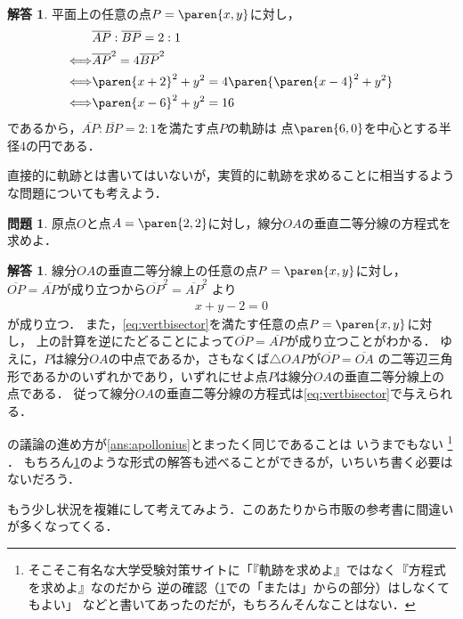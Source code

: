 \documentclass[11pt,a4paper]{ltjsarticle}
\newcommand*{\length}[1]{\overline{#1}}
\newcommand*{\equivalent}{\Longleftrightarrow}
\newcommand*{\coord}[1]{\paren{#1}}
\theoremstyle{definition}
\newtheorem{que}[dfn]{問題}
\newtheorem{ans}[dfn]{解答}
\begin{document}
\begin{ans} \label{ans:aplloniusomit}
  平面上の任意の点$P = \coord{x,y}$に対し，
  \begin{align*}
    & \length{AP} : \length{BP} = 2 : 1 \\
    \equivalent & \length{AP}^2 = 4 \length{BP}^2 \\
    \equivalent & \paren{x + 2}^2 + y^2 = 4 \paren{\paren{x - 4}^2 + y^2} \\
    \equivalent & \paren{x - 6}^2 + y^2 = 16
  \end{align*}
  であるから，$\length{AP} : \length{BP} = 2 : 1$を満たす点$P$の軌跡は
  点$\coord{6, 0}$を中心とする半径$4$の円である．
\end{ans}


直接的に軌跡とは書いてはいないが，実質的に軌跡を求めることに相当するような問題についても考えよう．

\begin{que} \label{que:vertbisector}
  原点$O$と点$A = \coord{2, 2}$に対し，線分$OA$の垂直二等分線の方程式を求めよ．
\end{que}

\begin{ans} \label{ans:vertbisector}
  線分$OA$の垂直二等分線上の任意の点$P = \coord{x, y}$に対し，
  $\length{OP} = \length{AP}$が成り立つから$\length{OP}^2 = \length{AP}^2$
  より
  \begin{align}
    x + y - 2 = 0
    \label{eq:vertbisector}
  \end{align}
  が成り立つ．
  また，\cref{eq:vertbisector}を満たす任意の点$P = \coord{x, y}$に対し，
  上の計算を逆にたどることによって$\length{OP} = \length{AP}$が成り立つことがわかる．
  ゆえに，$P$は線分$OA$の中点であるか，さもなくば$\triangle OAP$が$\length{OP} = \length{OA}$
  の二等辺三角形であるかのいずれかであり，いずれにせよ点$P$は線分$OA$の垂直二等分線上の点である．
  従って線分$OA$の垂直二等分線の方程式は\cref{eq:vertbisector}で与えられる．
\end{ans}

の議論の進め方が\cref{ans:apollonius}とまったく同じであることは
いうまでもない%
\footnote{%
  そこそこ有名な大学受験対策サイトに「『軌跡を求めよ』ではなく『方程式を求めよ』なのだから
  逆の確認（\cref{ans:vertbisector}での「または」からの部分）はしなくてもよい」
  などと書いてあったのだが，もちろんそんなことはない．
}%
．
もちろん\cref{ans:aplloniusomit}のような形式の解答も述べることができるが，いちいち書く必要はないだろう．

もう少し状況を複雑にして考えてみよう．このあたりから市販の参考書に間違いが多くなってくる．
\end{document}
